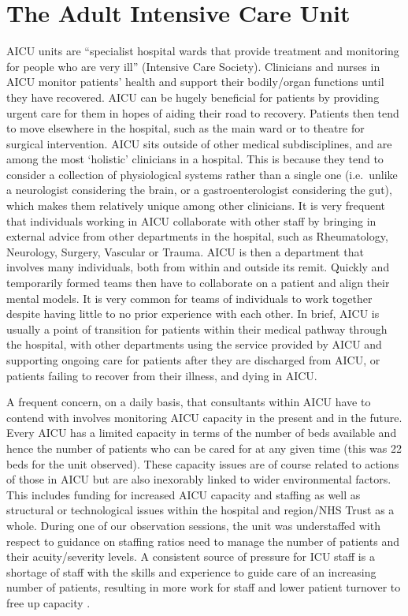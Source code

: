 \documentclass[a4paper, nobind]{templates/ociamthesis}
\begin{document}
\section{The Adult Intensive Care Unit}\label{the-adult-intensive-care-unit}

AICU units are ``specialist hospital wards that provide treatment and monitoring for people who are very ill'' (Intensive Care Society). Clinicians and nurses in AICU monitor patients' health and support their bodily/organ functions until they have recovered. AICU can be hugely beneficial for patients by providing urgent care for them in hopes of aiding their road to recovery. Patients then tend to move elsewhere in the hospital, such as the main ward or to theatre for surgical intervention. AICU sits outside of other medical subdisciplines, and are among the most `holistic' clinicians in a hospital. This is because they tend to consider a collection of physiological systems rather than a single one (i.e.~unlike a neurologist considering the brain, or a gastroenterologist considering the gut), which makes them relatively unique among other clinicians. It is very frequent that individuals working in AICU collaborate with other staff by bringing in external advice from other departments in the hospital, such as Rheumatology, Neurology, Surgery, Vascular or Trauma. AICU is then a department that involves many individuals, both from within and outside its remit. Quickly and temporarily formed teams then have to collaborate on a patient and align their mental models. It is very common for teams of individuals to work together despite having little to no prior experience with each other. In brief, AICU is usually a point of transition for patients within their medical pathway through the hospital, with other departments using the service provided by AICU and supporting ongoing care for patients after they are discharged from AICU, or patients failing to recover from their illness, and dying in AICU.

\hfill\break
A frequent concern, on a daily basis, that consultants within AICU have to contend with involves monitoring AICU capacity in the present and in the future. Every AICU has a limited capacity in terms of the number of beds available and hence the number of patients who can be cared for at any given time (this was 22 beds for the unit observed). These capacity issues are of course related to actions of those in AICU but are also inexorably linked to wider environmental factors. This includes funding for increased AICU capacity and staffing as well as structural or technological issues within the hospital and region/NHS Trust as a whole. During one of our observation sessions, the unit was understaffed with respect to guidance on staffing ratios need to manage the number of patients and their acuity/severity levels. A consistent source of pressure for ICU staff is a shortage of staff with the skills and experience to guide care of an increasing number of patients, resulting in more work for staff and lower patient turnover to free up capacity \autocite{page_strategies_2024}.
\end{document}
